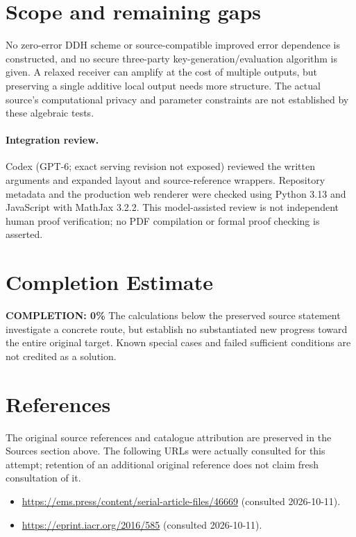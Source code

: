 \documentclass[11pt]{article}
\begin{document}
\section{Scope and remaining gaps}
No zero-error DDH scheme or source-compatible improved error dependence is constructed, and no secure three-party key-generation/evaluation algorithm is given. A relaxed receiver can amplify at the cost of multiple outputs, but preserving a single additive local output needs more structure. The actual source's computational privacy and parameter constraints are not established by these algebraic tests.
\paragraph{Integration review.} Codex (GPT-6; exact serving revision not exposed) reviewed the written arguments and expanded layout and source-reference wrappers. Repository metadata and the production web renderer were checked using Python 3.13 and JavaScript with MathJax 3.2.2. This model-assisted review is not independent human proof verification; no PDF compilation or formal proof checking is asserted.

\section{Completion Estimate}
\noindent\textbf{COMPLETION: 0\%}
The calculations below the preserved source statement investigate a concrete route,
but establish no substantiated new progress toward the entire original target.
Known special cases and failed sufficient conditions are not credited as a solution.
\section{References}
The original source references and catalogue attribution are preserved in the
Sources section above. The following URLs were actually consulted for this attempt;
retention of an additional original reference does not claim fresh consultation of it.
\begin{itemize}
\item \url{https://ems.press/content/serial-article-files/46669} (consulted 2026-10-11). 
\item \url{https://eprint.iacr.org/2016/585} (consulted 2026-10-11). 
\end{itemize}
\end{document}
